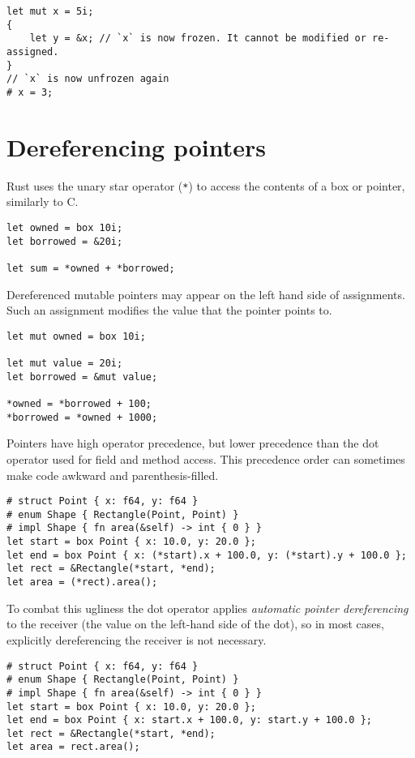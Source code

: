 \documentclass[]{article}
\begin{document}
\begin{verbatim}
let mut x = 5i;
{
    let y = &x; // `x` is now frozen. It cannot be modified or re-assigned.
}
// `x` is now unfrozen again
# x = 3;
\end{verbatim}

\section{Dereferencing pointers}\label{dereferencing-pointers}

Rust uses the unary star operator (\texttt{*}) to access the contents of
a box or pointer, similarly to C.

\begin{verbatim}
let owned = box 10i;
let borrowed = &20i;

let sum = *owned + *borrowed;
\end{verbatim}

Dereferenced mutable pointers may appear on the left hand side of
assignments. Such an assignment modifies the value that the pointer
points to.

\begin{verbatim}
let mut owned = box 10i;

let mut value = 20i;
let borrowed = &mut value;

*owned = *borrowed + 100;
*borrowed = *owned + 1000;
\end{verbatim}

Pointers have high operator precedence, but lower precedence than the
dot operator used for field and method access. This precedence order can
sometimes make code awkward and parenthesis-filled.

\begin{verbatim}
# struct Point { x: f64, y: f64 }
# enum Shape { Rectangle(Point, Point) }
# impl Shape { fn area(&self) -> int { 0 } }
let start = box Point { x: 10.0, y: 20.0 };
let end = box Point { x: (*start).x + 100.0, y: (*start).y + 100.0 };
let rect = &Rectangle(*start, *end);
let area = (*rect).area();
\end{verbatim}

To combat this ugliness the dot operator applies \emph{automatic pointer
dereferencing} to the receiver (the value on the left-hand side of the
dot), so in most cases, explicitly dereferencing the receiver is not
necessary.

\begin{verbatim}
# struct Point { x: f64, y: f64 }
# enum Shape { Rectangle(Point, Point) }
# impl Shape { fn area(&self) -> int { 0 } }
let start = box Point { x: 10.0, y: 20.0 };
let end = box Point { x: start.x + 100.0, y: start.y + 100.0 };
let rect = &Rectangle(*start, *end);
let area = rect.area();
\end{verbatim}
\end{document}
